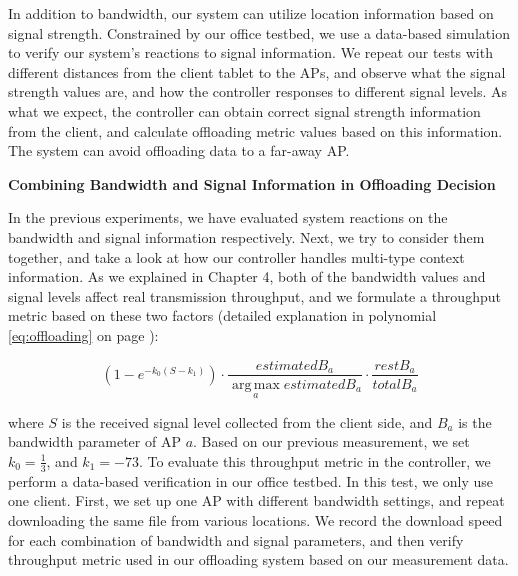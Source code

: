 \documentclass[english]{tktltiki}
\begin{document}
In addition to bandwidth, our system can utilize location information based on signal strength. Constrained by our office testbed, we use a data-based simulation to verify our system's reactions to signal information. We repeat our tests with different distances from the client tablet to the APs, and observe what the signal strength values are, and how the controller responses to different signal levels. As what we expect, the controller can obtain correct signal strength information from the client, and calculate offloading metric values based on this information. The system can avoid offloading data to a far-away AP.


\vspace{1mm}

\textbf{Combining Bandwidth and Signal Information in Offloading Decision}

\vspace{1mm}

In the previous experiments, we have evaluated system reactions on the bandwidth and signal information respectively. Next, we try to consider them together, and take a look at how our controller handles multi-type context information. As we explained in Chapter 4, both of the bandwidth values and signal levels affect real transmission throughput, and we formulate a throughput metric based on these two factors (detailed explanation in polynomial \ref{eq:offloading} on page \pageref{eq:offloading}):

$$(1 - e^{-k_0(S - k_1)}) \cdot  \frac{estimatedB_a}{\operatorname*{arg\,max}_a estimatedB_a} \cdot \frac{restB_a}{totalB_a}$$

where $S$ is the received signal level collected from the client side, and $B_a$ is the bandwidth parameter of AP $a$. Based on our previous measurement, we set $k_0 = \frac{1}{3}$, and $k_1 = -73$. To evaluate this throughput metric in the controller, we perform a data-based verification in our office testbed. In this test, we only use one client. First, we set up one AP with different bandwidth settings, and repeat downloading the same file from various locations. We record the download speed for each combination of bandwidth and signal parameters, and then verify throughput metric used in our offloading system based on our measurement data.
\end{document}
